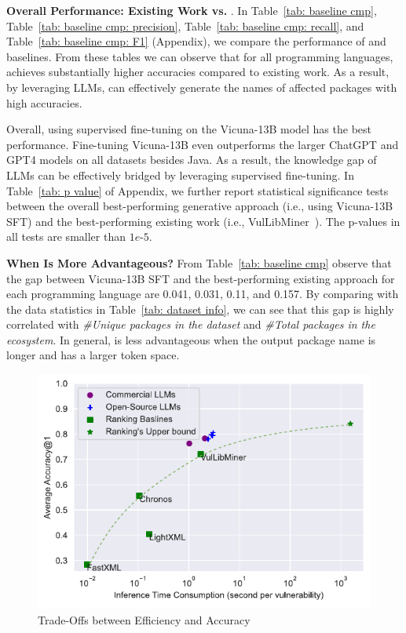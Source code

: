 \noindent \textbf{Overall Performance: Existing Work vs. \detector{}}. In Table~\ref{tab: baseline cmp}, Table~\ref{tab: baseline cmp: precision}, Table~\ref{tab: baseline cmp: recall}, and Table~\ref{tab: baseline cmp: F1} (Appendix), we compare the performance of \detector{} and baselines. 
From these tables we can observe that for all programming languages, \detector{} achieves substantially higher accuracies compared to existing work. As a result, by leveraging LLMs, \detector{} can effectively generate the names of affected packages with high accuracies. 

Overall, \detector{} using supervised fine-tuning on the Vicuna-13B model has the best performance. Fine-tuning Vicuna-13B even outperforms the larger ChatGPT and GPT4 models on all datasets besides Java. As a result, the knowledge gap of LLMs can be effectively bridged by leveraging supervised fine-tuning. In Table~\ref{tab: p value} of Appendix, we further report statistical significance tests~\cite{ttest} between the overall best-performing generative approach (i.e., \detector{} using Vicuna-13B SFT) and the best-performing existing work (i.e., VulLibMiner~\cite{vullibminer}). The p-values in all tests are smaller than $1e\textit{-}5$.


\noindent \textbf{When Is \detector{} More Advantageous?} From Table~\ref{tab: baseline cmp} observe that the gap between \detector{} Vicuna-13B SFT
and the best-performing existing approach for each programming language are 0.041, 0.031, 0.11, and 0.157. By comparing with the data statistics in Table~\ref{tab: dataset info}, we can see that this gap is highly correlated with \emph{\#Unique packages in the dataset} and \emph{\#Total packages in the ecosystem}. In general, \detector{} is less advantageous when the output package name is longer and has a larger token space. 


\begin{figure}[t]
\centering
\includegraphics[width=1\linewidth]{figures/efficiency_accuracy_advanced.drawio.pdf}
\caption{Trade-Offs between Efficiency and Accuracy}
\label{fig: efficiency accuracy}
\vspace{-0.3cm}
\end{figure}


